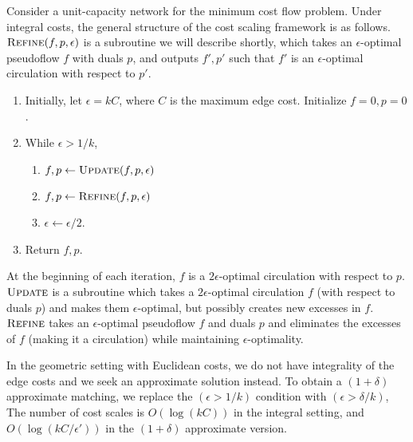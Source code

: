 \documentclass[11pt]{article}
\def\Refine{\textsc{Refine}}
\def\Update{\textsc{Update}}
\theoremstyle{plain}
\begin{document}
Consider a unit-capacity network for the minimum cost flow problem.
Under integral costs, the general structure of the cost scaling framework is as follows.
$\Refine(f, p, \epsilon)$ is a subroutine we will describe shortly,
which takes an $\epsilon$-optimal pseudoflow $f$ with duals $p$, 
and outputs $f', p'$ such that $f'$ is an $\epsilon$-optimal circulation with respect to $p'$.
\begin{enumerate}
\item Initially, let $\epsilon = kC$, where $C$ is the maximum edge cost.
	Initialize $f = 0, p = 0$.
\item While $\epsilon > 1/k$, 
	\begin{enumerate}
	\item $f, p \gets \Update(f, p, \epsilon)$
	\item $f, p \gets \Refine(f, p, \epsilon)$
	\item $\epsilon \gets \epsilon/2$.
	\end{enumerate}
\item Return $f, p$.
\end{enumerate}
At the beginning of each iteration, 
$f$ is a $2\epsilon$-optimal circulation with respect to $p$.
$\Update$ is a subroutine which takes a $2\epsilon$-optimal circulation $f$ 
(with respect to duals $p$) and makes them $\epsilon$-optimal,
but possibly creates new excesses in $f$.
$\Refine$ takes an $\epsilon$-optimal pseudoflow $f$ and duals $p$
and eliminates the excesses of $f$ (making it a circulation) 
while maintaining $\epsilon$-optimality.

In the geometric setting with Euclidean costs, 
we do not have integrality of the edge costs and we seek an approximate solution instead.
To obtain a $(1+\delta)$ approximate matching, 
we replace the $(\epsilon > 1/k)$ condition with $(\epsilon > \delta/k)$,
The number of cost scales is $O(\log(kC))$ in the integral setting, 
and $O(\log(kC/\epsilon'))$ in the $(1+\delta)$ approximate version.
\end{document}
